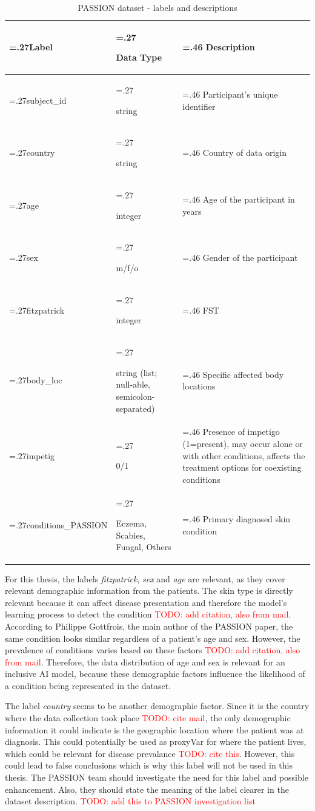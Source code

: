 \documentclass[12pt, a4paper, oneside]{book}   	%
\renewcommand{\todo}[1]{\textcolor{red}{TODO: #1}}
\begin{document}
				\begin{table}[H]
					\centering
					\begin{tabularx}{\textwidth}{>{\hsize=.27\hsize}X>{\hsize=.27\hsize\raggedright}X>{\hsize=.46\hsize}X}
						\toprule
						\textbf{Label}       & \textbf{Data Type} & \textbf{Description}       \\ \midrule
						subject\_id          & string & Participant's unique identifier        \\
						country              & string & Country of data origin \\
						age                  & integer & Age of the participant in years       \\
						sex                  & m/f/o & Gender of the participant               \\
						fitzpatrick          & integer & \gls{FST}                \\
						body\_loc            & string (list; null-able, semicolon-separated) & Specific affected body locations \\
						impetig              & 0/1  & Presence of impetigo (1=present), may occur alone or with other conditions, affects the treatment options for coexisting conditions        \\
						conditions\_PASSION  & Eczema, Scabies, Fungal, Others & Primary diagnosed skin condition \\
						\bottomrule
					\end{tabularx}
					\caption{PASSION dataset - labels and descriptions \autocite{Gottfrois2024}}
					\label{tab:PASSION_labels}
				\end{table}
				
				For this thesis, the labels \textit{fitzpatrick}, \textit{sex} and \textit{age} are relevant, as they cover relevant demographic information from the patients. The skin type is directly relevant because it can affect disease presentation and therefore the model's learning process to detect the condition \todo{add citation, also from mail}. According to Philippe Gottfrois, the main author of the PASSION paper, the same condition looks similar regardless of a patient's age and sex. However, the prevalence of conditions varies based on these factors \todo{add citation, also from mail}. Therefore, the data distribution of age and sex is relevant for an inclusive AI model, because these demographic factors influence the likelihood of a condition being represented in the dataset.
				
				The label \textit{country} seems to be another demographic factor. Since it is the country where the data collection took place \todo{cite mail}, the only demographic information it could indicate is the geographic location where the patient was at diagnosis. This could potentially be used as \gls{proxyVar} for where the patient lives, which could be relevant for disease prevalance \todo{cite this}. However, this could lead to false conclusions which is why this label will not be used in this thesis. The PASSION team should investigate the need for this label and possible enhancement. Also, they should state the meaning of the label clearer in the dataset description. \todo{add this to PASSION investigation list}
				
\end{document}
